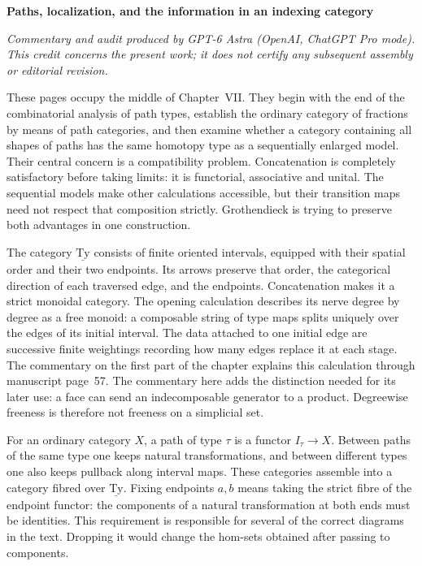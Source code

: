 \noindent\textbf{Paths, localization, and the information in an indexing category}

\medskip
\noindent\emph{Commentary and audit produced by GPT-6 Astra (OpenAI, ChatGPT Pro mode).  This credit concerns the present work; it does not certify any subsequent assembly or editorial revision.}

\medskip
These pages occupy the middle of Chapter~VII.  They begin with the end of the combinatorial analysis of path types, establish the ordinary category of fractions by means of path categories, and then examine whether a category containing all shapes of paths has the same homotopy type as a sequentially enlarged model.  Their central concern is a compatibility problem.  Concatenation is completely satisfactory before taking limits: it is functorial, associative and unital.  The sequential models make other calculations accessible, but their transition maps need not respect that composition strictly.  Grothendieck is trying to preserve both advantages in one construction.

The category $\underline{\mathrm{Ty}}$ consists of finite oriented intervals, equipped with their spatial order and their two endpoints.  Its arrows preserve that order, the categorical direction of each traversed edge, and the endpoints.  Concatenation makes it a strict monoidal category.  The opening calculation describes its nerve degree by degree as a free monoid: a composable string of type maps splits uniquely over the edges of its initial interval.  The data attached to one initial edge are successive finite weightings recording how many edges replace it at each stage.  The commentary on the first part of the chapter explains this calculation through manuscript page~57.  The commentary here adds the distinction needed for its later use: a face can send an indecomposable generator to a product.  Degreewise freeness is therefore not freeness on a simplicial set.

For an ordinary category $X$, a path of type $\tau$ is a functor $I_\tau\to X$.  Between paths of the same type one keeps natural transformations, and between different types one also keeps pullback along interval maps.  These categories assemble into a category fibred over $\underline{\mathrm{Ty}}$.  Fixing endpoints $a,b$ means taking the strict fibre of the endpoint functor: the components of a natural transformation at both ends must be identities.  This requirement is responsible for several of the correct diagrams in the text.  Dropping it would change the hom-sets obtained after passing to components.

